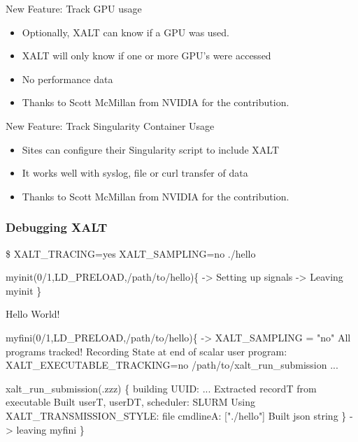 \documentclass{beamer}
\begin{document}
\begin{frame}{New Feature: Track GPU usage}
  \begin{itemize}
    \item Optionally, XALT can know if a GPU was used.
    \item XALT will only know if one or more GPU's were accessed
    \item No performance data
    \item Thanks to Scott McMillan from NVIDIA for the contribution.
  \end{itemize}
\end{frame}

\begin{frame}{New Feature: Track Singularity Container Usage}
  \begin{itemize}
    \item Sites can configure their Singularity script to include XALT
    \item It works well with syslog, file  or curl transfer of data
    \item Thanks to Scott McMillan from NVIDIA for the contribution.
  \end{itemize}
\end{frame}

\begin{frame}[fragile]
    \frametitle{Debugging XALT}
 {\tiny
    \begin{semiverbatim}
\$ XALT\_TRACING=yes XALT\_SAMPLING=no ./hello

myinit(0/1,LD_PRELOAD,/path/to/hello)\{
    -> Setting up signals
    -> Leaving myinit
\}

Hello World!

myfini(0/1,LD_PRELOAD,/path/to/hello)\{
    -> XALT_SAMPLING = "no" All programs tracked!
  Recording State at end of scalar user program:
    XALT_EXECUTABLE_TRACKING=no /path/to/xalt_run_submission ...

  xalt_run_submission(.zzz) \{
    building UUID: ...
    Extracted recordT from executable
    Built userT, userDT, scheduler: SLURM
    Using XALT_TRANSMISSION_STYLE: file
    cmdlineA: ["./hello"]
    Built json string
  \}
    -> leaving myfini
\}
    \end{semiverbatim}
}
\end{frame}
\end{document}
